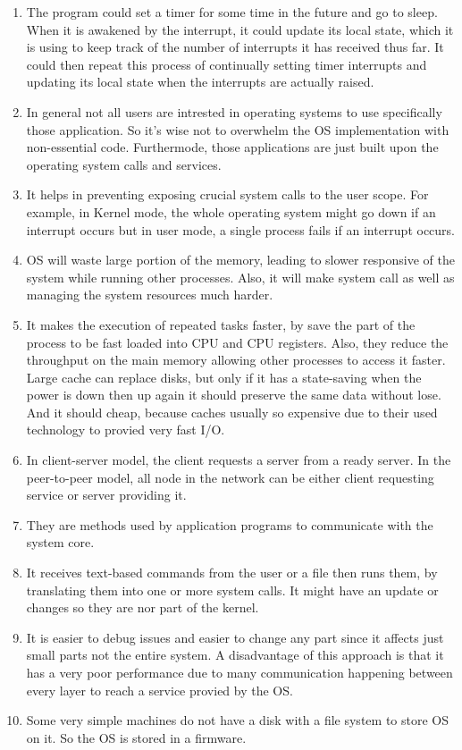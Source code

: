 \documentclass{article}
\begin{document}
\begin{enumerate}
  \item  The program could set a timer for some time in the future and go to sleep. When it is awakened by the interrupt, it could update its local state, which it is using to keep track of the number of interrupts it has received thus far. It could then repeat this process of continually setting timer interrupts and updating its local state when the interrupts are actually raised.

  \item In general not all users are intrested in operating systems to use specifically those application. So it's wise not to overwhelm the OS implementation with non-essential code. Furthermode, those applications
        are just built upon the operating system calls and services.

  \item It helps in preventing exposing crucial system calls to the user scope. For example,
        in Kernel mode, the whole operating system might go down if an interrupt occurs but
        in user mode, a single process fails if an interrupt occurs.

  \item OS will waste large portion of the memory, leading to slower responsive of the system while
        running other processes. Also,  it will make system call as well as managing the system resources much harder.

  \item It makes the execution of repeated tasks faster, by save the part of the process to be fast loaded into
        CPU and CPU registers. Also, they reduce the throughput on the main memory allowing other processes to access
        it faster. Large cache can replace disks, but only if it has a state-saving when the power is down then up again
        it should preserve the same data without lose. And it should cheap, because caches usually so expensive due to
        their used technology to provied very fast I/O.

  \item In client-server model, the client requests a server from a ready server. In the peer-to-peer model, all node
        in the network can be either client requesting service or server providing it.

  \item They are methods used by application programs to communicate with the system core.

  \item It receives text-based commands from the user or a file then runs them, by translating them into one or more system
        calls. It might have an update or changes so they are nor part of the kernel.
  \item It is easier to debug issues and easier to change any part since it affects just small parts not the entire system.
        A disadvantage of this approach is that it has a very poor performance due to many communication happening between
        every layer to reach a service provied by the OS.

  \item Some very simple machines do not have a disk with a file system to store OS on it. So the OS is stored in a firmware.
\end{enumerate}
\end{document}
